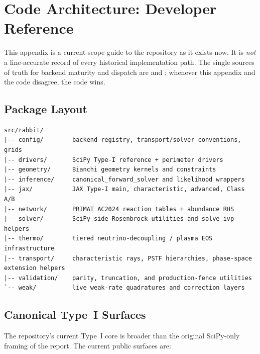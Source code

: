 \section{Code Architecture: Developer Reference}\label{app:code}

This appendix is a current-scope guide to the repository as it exists now.  It is \emph{not} a line-accurate record of every historical implementation path.  The single sources of truth for backend maturity and dispatch are  and ; whenever this appendix and the code disagree, the code wins.

\subsection{Package Layout}

\begin{verbatim}
src/rabbit/
|-- config/        backend registry, transport/solver conventions, grids
|-- drivers/       SciPy Type-I reference + perimeter drivers
|-- geometry/      Bianchi geometry kernels and constraints
|-- inference/     canonical_forward_solver and likelihood wrappers
|-- jax/           JAX Type-I main, characteristic, advanced, Class A/B
|-- network/       PRIMAT AC2024 reaction tables + abundance RHS
|-- solver/        SciPy-side Rosenbrock utilities and solve_ivp helpers
|-- thermo/        tiered neutrino-decoupling / plasma EOS infrastructure
|-- transport/     characteristic rays, PSTF hierarchies, phase-space extension helpers
|-- validation/    parity, truncation, and production-fence utilities
`-- weak/          live weak-rate quadratures and correction layers
\end{verbatim}

\subsection{Canonical Type~I Surfaces}

The repository's current Type~I core is broader than the original SciPy-only framing of the report.  The current public surfaces are:

